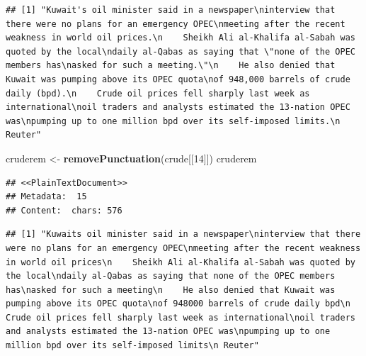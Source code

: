 \documentclass[]{book}
\newenvironment{Shaded}{\begin{snugshade}}{\end{snugshade}}
\newcommand{\KeywordTok}[1]{\textcolor[rgb]{0.13,0.29,0.53}{\textbf{{#1}}}}
\newcommand{\DataTypeTok}[1]{\textcolor[rgb]{0.13,0.29,0.53}{{#1}}}
\newcommand{\DecValTok}[1]{\textcolor[rgb]{0.00,0.00,0.81}{{#1}}}
\newcommand{\StringTok}[1]{\textcolor[rgb]{0.31,0.60,0.02}{{#1}}}
\newcommand{\OtherTok}[1]{\textcolor[rgb]{0.56,0.35,0.01}{{#1}}}
\newcommand{\NormalTok}[1]{{#1}}
\begin{document}
\begin{verbatim}
## [1] "Kuwait's oil minister said in a newspaper\ninterview that there were no plans for an emergency OPEC\nmeeting after the recent weakness in world oil prices.\n    Sheikh Ali al-Khalifa al-Sabah was quoted by the local\ndaily al-Qabas as saying that \"none of the OPEC members has\nasked for such a meeting.\"\n    He also denied that Kuwait was pumping above its OPEC quota\nof 948,000 barrels of crude daily (bpd).\n    Crude oil prices fell sharply last week as international\noil traders and analysts estimated the 13-nation OPEC was\npumping up to one million bpd over its self-imposed limits.\n Reuter"
\end{verbatim}

\begin{Shaded}
\begin{Highlighting}[]
\NormalTok{cruderem <-}\StringTok{ }\KeywordTok{removePunctuation}\NormalTok{(crude[[}\DecValTok{14}\NormalTok{]])}
\NormalTok{cruderem}
\end{Highlighting}
\end{Shaded}

\begin{verbatim}
## <<PlainTextDocument>>
## Metadata:  15
## Content:  chars: 576
\end{verbatim}

\begin{Shaded}
\end{Shaded}

\begin{verbatim}
## [1] "Kuwaits oil minister said in a newspaper\ninterview that there were no plans for an emergency OPEC\nmeeting after the recent weakness in world oil prices\n    Sheikh Ali al-Khalifa al-Sabah was quoted by the local\ndaily al-Qabas as saying that none of the OPEC members has\nasked for such a meeting\n    He also denied that Kuwait was pumping above its OPEC quota\nof 948000 barrels of crude daily bpd\n    Crude oil prices fell sharply last week as international\noil traders and analysts estimated the 13-nation OPEC was\npumping up to one million bpd over its self-imposed limits\n Reuter"
\end{verbatim}
\end{document}
